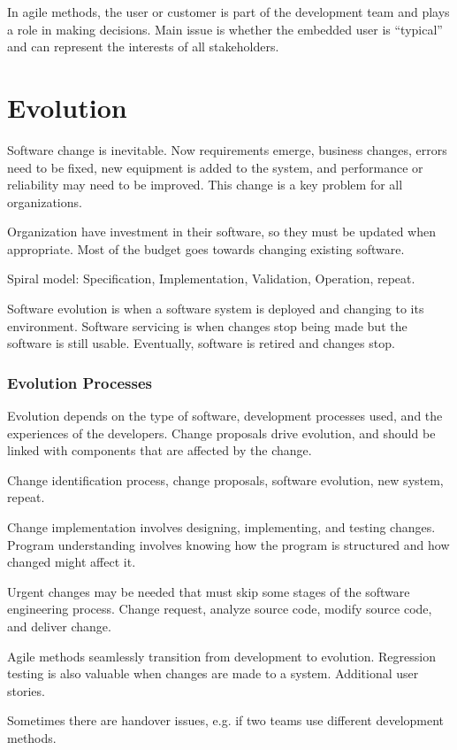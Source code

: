 \documentclass[12pt]{article}
\begin{document}
In agile methods, the user or customer is part of the development team and
plays a role in making decisions. Main issue is whether the embedded user
is ``typical'' and can represent the interests of all stakeholders.

\section*{Evolution}

Software change is inevitable. Now requirements emerge, business changes,
errors need to be fixed, new equipment is added to the system, and performance
or reliability may need to be improved. This change is a key problem for all
organizations.

Organization have investment in their software, so they must be updated when
appropriate. Most of the budget goes towards changing existing software.

Spiral model: Specification, Implementation, Validation, Operation, repeat.

Software evolution is when a software system is deployed and changing to its
environment. Software servicing is when changes stop being made but the
software is still usable. Eventually, software is retired and changes stop.

\subsubsection*{Evolution Processes}

Evolution depends on the type of software, development processes used, and
the experiences of the developers. Change proposals drive evolution, and should
be linked with components that are affected by the change.

Change identification process, change proposals, software evolution, new
system, repeat.

Change implementation involves designing, implementing, and testing changes.
Program understanding involves knowing how the program is structured and how
changed might affect it.

Urgent changes may be needed that must skip some stages of the software
engineering process. Change request, analyze source code, modify source code,
and deliver change.

Agile methods seamlessly transition from development to evolution. Regression
testing is also valuable when changes are made to a system. Additional user
stories.

Sometimes there are handover issues, e.g. if two teams use different
development methods.
\end{document}
